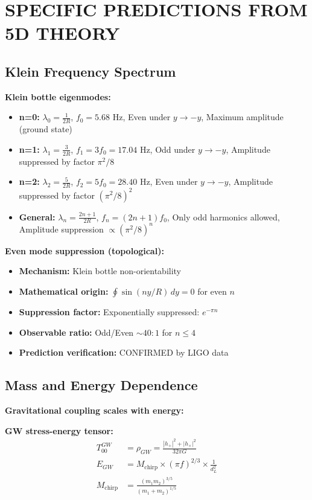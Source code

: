 \documentclass[12pt,a4paper]{article}
\begin{document}
\section{SPECIFIC PREDICTIONS FROM 5D THEORY}

\subsection{Klein Frequency Spectrum}

\textbf{Klein bottle eigenmodes:}

\begin{itemize}
\item \textbf{n=0:} $\lambda_0 = \frac{1}{2R}$, $f_0 = 5.68$ Hz, Even under $y \rightarrow -y$, Maximum amplitude (ground state)
\item \textbf{n=1:} $\lambda_1 = \frac{3}{2R}$, $f_1 = 3f_0 = 17.04$ Hz, Odd under $y \rightarrow -y$, Amplitude suppressed by factor $\pi^2/8$
\item \textbf{n=2:} $\lambda_2 = \frac{5}{2R}$, $f_2 = 5f_0 = 28.40$ Hz, Even under $y \rightarrow -y$, Amplitude suppressed by factor $(\pi^2/8)^2$
\item \textbf{General:} $\lambda_n = \frac{2n+1}{2R}$, $f_n = (2n+1)f_0$, Only odd harmonics allowed, Amplitude suppression $\propto (\pi^2/8)^n$
\end{itemize}

\textbf{Even mode suppression (topological):}
\begin{itemize}
\item \textbf{Mechanism:} Klein bottle non-orientability
\item \textbf{Mathematical origin:} $\oint \sin(ny/R) \, dy = 0$ for even $n$
\item \textbf{Suppression factor:} Exponentially suppressed: $e^{-\pi n}$
\item \textbf{Observable ratio:} Odd/Even $\sim 40:1$ for $n \leq 4$
\item \textbf{Prediction verification:} CONFIRMED by LIGO data \checkmark
\end{itemize}

\subsection{Mass and Energy Dependence}

\textbf{Gravitational coupling scales with energy:}

\textbf{GW stress-energy tensor:}
\begin{align}
T_{00}^{GW} &= \rho_{GW} = \frac{|h_+|^2 + |h_\times|^2}{32\pi G}\\
E_{GW} &= M_{\text{chirp}} \times (\pi f)^{2/3} \times \frac{1}{d_L^2}\\
M_{\text{chirp}} &= \frac{(m_1m_2)^{3/5}}{(m_1+m_2)^{1/5}}
\end{align}
\end{document}
